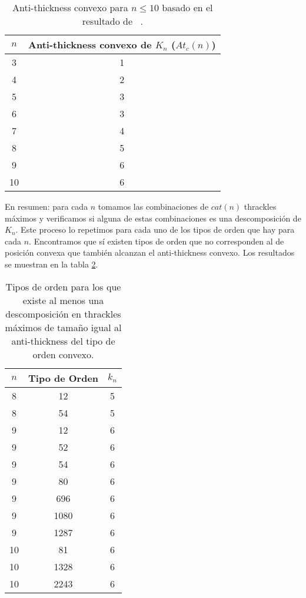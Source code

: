 \begin{table}[t]
  \centering
  \begin{tabular}{|c|c|}
    \hline
    $n$ & Anti-thickness convexo de $K_n$ ($At_c(n)$) \\ \hline\hline
    3   & 1  \\
    4   & 2  \\
    5   & 3  \\
    6   & 3  \\
    7   & 4  \\
    8   & 5  \\
    9   & 6  \\
    10  & 6  \\ \hline
  \end{tabular}
  \caption{ Anti-thickness convexo para $n\leq 10$ basado en el resultado de ~\cite{Fabila-Monroy2018}.}
  \label{table:atconvexo}
\end{table}

En resumen: para cada $n$ tomamos las combinaciones de $cat(n)$ thrackles máximos y
verificamos si alguna de estas combinaciones es una descomposición de $K_n$. Este proceso
lo repetimos para cada uno de los tipos de orden que hay para cada $n$.
Encontramos que sí existen tipos de orden que no corresponden al de posición convexa que también
alcanzan el anti-thickness convexo. Los resultados se muestran en la tabla \ref{table:res_desc_th_max}.
\begin{table}[t]
  \centering
  \begin{tabular}{|c|c|c|}
    \hline
    $n$   & Tipo de Orden & $k_n$ \\ \hline\hline
    8 & 12   & 5  \\
    8 & 54   & 5  \\ \hline
    9 & 12   & 6  \\
    9 & 52   & 6  \\
    9 & 54   & 6  \\
    9 & 80   & 6  \\
    9 & 696  & 6  \\
    9 & 1080 & 6  \\
    9 & 1287 & 6  \\ \hline
   10 & 81   & 6  \\
   10 & 1328 & 6  \\
   10 & 2243 & 6  \\ \hline
  \end{tabular}

  \caption{Tipos de orden para los que existe al menos una descomposición en thrackles máximos
  de tamaño igual al anti-thickness del tipo de orden convexo.}
  \label{table:res_desc_th_max}
\end{table}

